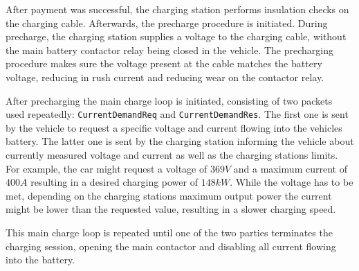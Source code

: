 \documentclass[conference,flushend]{iaria} %
\begin{document}
After payment was successful, the charging station performs insulation checks on the charging cable.
Afterwards, the precharge procedure is initiated.
During precharge, the charging station supplies a voltage to the charging cable, without the main battery contactor relay being closed in the vehicle.
The precharging procedure makes sure the voltage present at the cable matches the battery voltage, reducing in rush current and reducing wear on the contactor relay.

After precharging the main charge loop is initiated, consisting of two packets used repeatedly: \verb'CurrentDemandReq' and \verb'CurrentDemandRes'.
The first one is sent by the vehicle to request a specific voltage and current flowing into the vehicles battery.
The latter one is sent by the charging station informing the vehicle about currently measured voltage and current as well as the charging stations limits.
For example, the car might request a voltage of $369V$ and a maximum current of $400A$ resulting in a desired charging power of $148kW$.
While the voltage has to be met, depending on the charging stations maximum output power the current might be lower than the requested value, resulting in a slower charging speed.

This main charge loop is repeated until one of the two parties terminates the charging session, opening the main contactor and disabling all current flowing into the battery.
\end{document}
